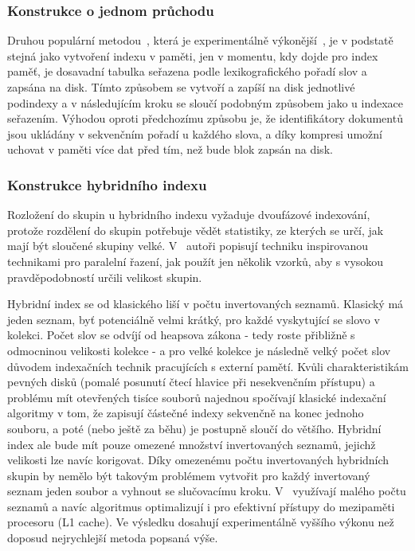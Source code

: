 \documentclass[11pt,letterpaper,oneside,openright]{book}
\begin{document}
\subsubsection{Konstrukce o jednom průchodu}
Druhou populární metodou~\citep[kap.~3]{Manning:2008:IIR:1394399}, která je
experimentálně výkonější~\cite{Heinz:2003:ESI:873988.873992}, je v podstatě
stejná jako vytvoření indexu v paměti, jen v momentu, kdy dojde pro index
paměť, je dosavadní tabulka seřazena podle lexikografického pořadí slov a
zapsána na disk. Tímto způsobem se vytvoří a zapíší na disk jednotlivé
podindexy a v následujícím kroku se sloučí podobným způsobem jako u indexace
seřazením. Výhodou oproti předchozímu způsobu je, že identifikátory dokumentů
jsou ukládány v sekvenčním pořadí u každého slova, a díky kompresi umožní
uchovat v paměti více dat před tím, než bude blok zapsán na disk.

\subsubsection{Konstrukce hybridního indexu}
Rozložení do skupin u hybridního indexu vyžaduje dvoufázové indexování, protože
rozdělení do skupin potřebuje vědět statistiky, ze kterých se určí, jak mají
být sloučené skupiny velké. V~\cite{Bast:2011:FCH:1993036.1993040} autoři
popisují techniku inspirovanou technikami pro paralelní řazení, jak použít jen
několik vzorků, aby s vysokou pravděpodobností určili velikost skupin.

Hybridní index se od klasického liší v počtu invertovaných seznamů. Klasický má
jeden seznam, byť potenciálně velmi krátký, pro každé vyskytující se slovo v
kolekci. Počet slov se odvíjí od heapsova zákona - tedy roste přibližně s
odmocninou velikosti kolekce - a pro velké kolekce je následně velký počet slov
důvodem indexačních technik pracujících s externí pamětí. Kvůli
charakteristikám pevných disků (pomalé posunutí čtecí hlavice při nesekvenčním
přístupu) a problému mít otevřených tisíce souborů najednou spočívají klasické
indexační algoritmy v tom, že zapisují částečné indexy sekvenčně na konec
jednoho souboru, a poté (nebo ještě za běhu) je postupně sloučí do většího.
Hybridní index ale bude mít pouze omezené množství invertovaných seznamů,
jejichž velikosti lze navíc korigovat. Díky omezenému počtu invertovaných
hybridních skupin by nemělo být takovým problémem vytvořit pro každý
invertovaný seznam jeden soubor a vyhnout se slučovacímu kroku.
V~\cite{Bast:2011:FCH:1993036.1993040} využívají malého počtu seznamů a navíc
algoritmus optimalizují i pro efektivní přístupy do mezipaměti procesoru (L1
cache). Ve výsledku dosahují experimentálně vyššího výkonu než doposud
nejrychlejší metoda  popsaná výše.
\end{document}
